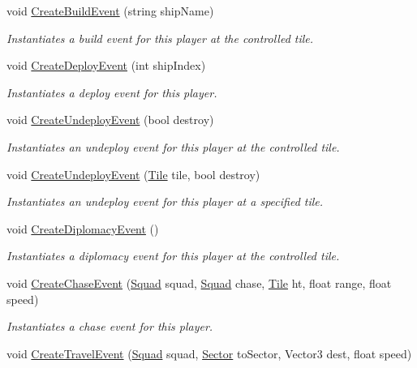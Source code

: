 \begin{DoxyCompactItemize}
void \hyperlink{class_player_a09e42ba337cfc0b8d81186cc980c4a27}{Create\+Build\+Event} (string ship\+Name)
\begin{DoxyCompactList}\small\item\em Instantiates a build event for this player at the controlled tile. \end{DoxyCompactList}\item 
void \hyperlink{class_player_a668069722ca0fdadb0f61ef5e39dd541}{Create\+Deploy\+Event} (int ship\+Index)
\begin{DoxyCompactList}\small\item\em Instantiates a deploy event for this player. \end{DoxyCompactList}\item 
void \hyperlink{class_player_a6c7302210ee5e2f6385556b334cb7b2b}{Create\+Undeploy\+Event} (bool destroy)
\begin{DoxyCompactList}\small\item\em Instantiates an undeploy event for this player at the controlled tile. \end{DoxyCompactList}\item 
void \hyperlink{class_player_ad63e7f94e6076b2e5f224ae4366e05c2}{Create\+Undeploy\+Event} (\hyperlink{class_tile}{Tile} tile, bool destroy)
\begin{DoxyCompactList}\small\item\em Instantiates an undeploy event for this player at a specified tile. \end{DoxyCompactList}\item 
void \hyperlink{class_player_ad160953a5ad1a06fdae7811560d542b9}{Create\+Diplomacy\+Event} ()
\begin{DoxyCompactList}\small\item\em Instantiates a diplomacy event for this player at the controlled tile. \end{DoxyCompactList}\item 
void \hyperlink{class_player_ae9ca049e45010b4fb4df852c77b65b82}{Create\+Chase\+Event} (\hyperlink{class_squad}{Squad} squad, \hyperlink{class_squad}{Squad} chase, \hyperlink{class_tile}{Tile} ht, float range, float speed)
\begin{DoxyCompactList}\small\item\em Instantiates a chase event for this player. \end{DoxyCompactList}\item 
void \hyperlink{class_player_af2aa2569d28ad50209a183585711a8eb}{Create\+Travel\+Event} (\hyperlink{class_squad}{Squad} squad, \hyperlink{class_sector}{Sector} to\+Sector, Vector3 dest, float speed)

\end{DoxyCompactItemize}
